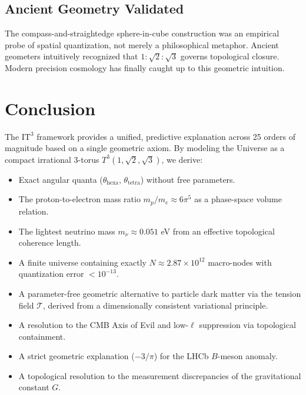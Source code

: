 \documentclass[12pt,a4paper,oneside]{article}
\theoremstyle{plain}
\theoremstyle{definition}
\theoremstyle{remark}
\newcommand{\ITthree}{\mathrm{IT}^3}
\newcommand{\tension}{\mathcal{T}}
\newcommand{\GNewton}{G}
\begin{document}
\subsection{Ancient Geometry Validated}
The compass-and-straightedge sphere-in-cube construction was an empirical probe of spatial quantization, not merely a philosophical metaphor. Ancient geometers intuitively recognized that $1:\sqrt{2}:\sqrt{3}$ governs topological closure. Modern precision cosmology has finally caught up to this geometric intuition.

\section{Conclusion}
\label{sec:conclusion}

The \texorpdfstring{$\ITthree$}{IT3} framework provides a unified, predictive explanation across 25 orders of magnitude based on a single geometric axiom. By modeling the Universe as a compact irrational 3-torus $T^3(1,\sqrt{2},\sqrt{3})$, we derive:
\begin{itemize}
    \item Exact angular quanta ($\theta_{\mathrm{hexa}}$, $\theta_{\mathrm{tetra}}$) without free parameters.
    \item The proton-to-electron mass ratio $m_p/m_e \approx 6\pi^5$ as a phase-space volume relation.
    \item The lightest neutrino mass $m_\nu \approx 0.051$ eV from an effective topological coherence length.
    \item A finite universe containing exactly $N \approx 2.87 \times 10^{12}$ macro-nodes with quantization error $<10^{-13}$.
    \item A parameter-free geometric alternative to particle dark matter via the tension field $\tension$, derived from a dimensionally consistent variational principle.
    \item A resolution to the CMB Axis of Evil and low-$\ell$ suppression via topological containment.
    \item A strict geometric explanation ($-3/\pi$) for the LHCb $B$-meson anomaly.
    \item A topological resolution to the measurement discrepancies of the gravitational constant $\GNewton$.
\end{itemize}
\end{document}

